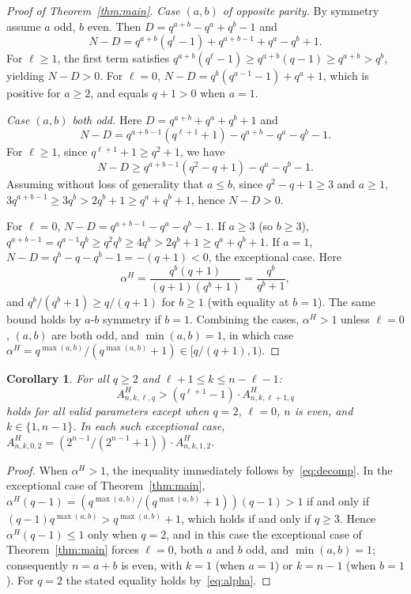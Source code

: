 \documentclass[11pt]{article}
\theoremstyle{plain}
\newtheorem{corollary}[theorem]{Corollary}
\theoremstyle{remark}
\begin{document}
\begin{proof}[Proof of Theorem~\ref{thm:main}]
\emph{Case $(a, b)$ of opposite parity.}
By symmetry assume $a$ odd, $b$ even. Then $D = q^{a+b}-q^{a}+q^{b}-1$ and
\[
  N - D = q^{a+b}(q^{\ell}-1) + q^{a+b-1} + q^{a} - q^{b} + 1.
\]
For $\ell\geq 1$, the first term satisfies $q^{a+b}(q^{\ell}-1) \geq q^{a+b}(q-1) \geq q^{a+b} > q^{b}$,
yielding $N-D > 0$.
For $\ell = 0$, $N - D = q^{b}(q^{a-1}-1) + q^{a} + 1$,
which is positive for $a \geq 2$, and equals $q+1 > 0$ when $a = 1$.

\emph{Case $(a, b)$ both odd.}
Here $D = q^{a+b}+q^{a}+q^{b}+1$ and
\[
  N - D = q^{a+b-1}(q^{\ell+1}+1) - q^{a+b} - q^{a} - q^{b} - 1.
\]
For $\ell \geq 1$, since $q^{\ell+1}+1 \geq q^{2}+1$, we have
\[
  N - D \geq q^{a+b-1}(q^{2}-q+1) - q^{a} - q^{b} - 1.
\]
Assuming without loss of generality that $a \leq b$, since $q^{2}-q+1 \geq 3$ and $a \geq 1$,
$3q^{a+b-1} \geq 3q^{b} > 2q^{b}+1 \geq q^{a}+q^{b}+1$, hence $N-D > 0$.

For $\ell = 0$, $N - D = q^{a+b-1} - q^{a} - q^{b} - 1$.
If $a \geq 3$ (so $b \geq 3$), $q^{a+b-1} = q^{a-1}q^{b} \geq q^{2}q^{b} \geq 4q^{b} > 2q^{b}+1 \geq q^{a}+q^{b}+1$.
If $a = 1$, $N - D = q^{b} - q - q^{b} - 1 = -(q+1) < 0$, the exceptional case.
Here
\[
  \alpha^H = \frac{q^{b}(q+1)}{(q+1)(q^{b}+1)} = \frac{q^{b}}{q^{b}+1},
\]
and $q^{b}/(q^{b}+1) \geq q/(q+1)$ for $b \geq 1$ (with equality at $b=1$).
The same bound holds by $a$-$b$ symmetry if $b = 1$.
Combining the cases, $\alpha^H > 1$ unless $\ell=0$, $(a,b)$ are both odd, and
$\min(a,b) = 1$, in which case $\alpha^H = q^{\max(a,b)}/(q^{\max(a,b)}+1) \in [q/(q+1), 1)$.
\end{proof}

\begin{corollary}\label{cor:Amonotone-strict}
For all $q \geq 2$ and $\ell+1\leq k\leq n-\ell-1$:
\[
  A^H_{n,k,\ell,q} > (q^{\ell+1}-1)\cdot A^H_{n,k,\ell+1,q}
\]
holds for all valid parameters except when $q = 2$, $\ell = 0$, $n$ is even, and $k\in\{1, n-1\}$.
In each such exceptional case,
$A^H_{n,k,0,2} = (2^{n-1}/(2^{n-1}+1))\cdot A^H_{n,k,1,2}$.
\end{corollary}

\begin{proof}
When $\alpha^H > 1$, the inequality immediately follows by~\eqref{eq:decomp}.
In the exceptional case of Theorem~\ref{thm:main},
$\alpha^H(q-1) = (q^{\max(a,b)}/(q^{\max(a,b)}+1))(q-1) > 1$
if and only if $(q-1)q^{\max(a,b)} > q^{\max(a,b)}+1$, which holds if and only if
$q\geq 3$. Hence $\alpha^H(q-1) \leq 1$ only when $q=2$, and in this case the
exceptional case of Theorem~\ref{thm:main} forces $\ell = 0$, both $a$ and $b$
odd, and $\min(a,b) = 1$; consequently $n = a + b$ is even, with $k = 1$ (when
$a = 1$) or $k = n - 1$ (when $b = 1$). For $q = 2$ the stated equality holds
by~\eqref{eq:alpha}.
\end{proof}
\end{document}
